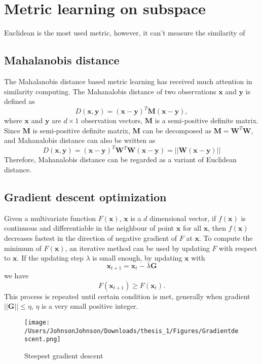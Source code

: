 \chapter{Metric learning on subspace}
Euclidean is the most used metric, however, it can't measure the similarity of 


\section{Mahalanobis distance}
The Mahalanobis distance \cite{Mahadist} based metric learning has received much attention in similarity computing. The Mahanalobis distance of two observations $\bm{x} $ and $\bm{y}$ is defined as
\begin{equation}
D(\bm{x},\bm{y}) = (\bm{x} - \bm{y})^T\bm{M}(\bm{x} - \bm{y}), 
\end{equation}
where $\bm{x}$ and $\bm{y} $ are $d\times1$ observation vectors, $\bm{M}$ is a semi-positive definite matrix. Since $\bm{M}$ is semi-positive definite matrix, $\bm{M}$ can be decomposed as $\bm{M} = \bm{W}^T\bm{W}$, and Mahanalobis distance can also be written as 
\begin{equation}
D(\bm{x},\bm{y}) = (\bm{x} - \bm{y})^T\bm{W}^T\bm{W}(\bm{x} - \bm{y})= ||\bm{W}(\bm{x} - \bm{y})||
\end{equation}
 Therefore, Mahanalobis distance can be regarded as a variant of Euclidean distance.
 
 \section{Gradient descent optimization}
 Given a multivariate function $F(\bm{x})$, $\bm{x}$ is a $d$ dimensional vector, if $f(\bm{x})$ is continuous and differentiable in the neighbour of point $\bm{x}$ for all $\bm{x}$, then $f(\bm{x})$ decreases fastest in the direction of negative gradient of $F$ at $\bm{x}$. To compute the minimum of $F(\bm{x})$, an iterative method can be used by updating $F$ with respect to $\bm{x}$. If the updating step $\lambda$ is small enough, by updating $\bm{x}$ with 
 \begin{equation}
 \bm{x}_{t+1} = \bm{x}_{t} - \lambda \bm{G}
 \end{equation}
we have 
  \begin{equation}
 F(\bm{x}_{t+1}) \ge F(\bm{x}_t).
  \end{equation}
This process is repeated until certain condition is met, generally when gradient $||\bm{G}|| \le \eta$, $\eta$ is a very small positive integer. 
\begin{figure}
\centering
\texttt{[image: /Users/JohnsonJohnson/Downloads/thesis\_1/Figures/Gradientdescent.png]}
\caption{Steepest gradient descent}
\vspace{0em}
\end{figure} 

